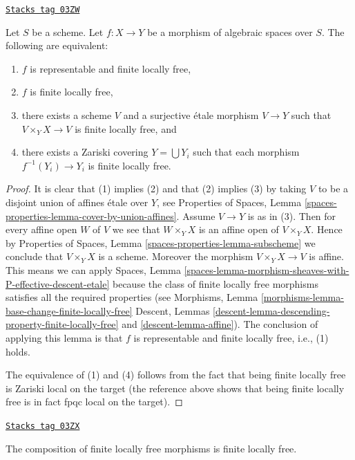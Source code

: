 \begin{lemma}
\label{spaces-morphisms-lemma-finite-locally-free-local}
\href{https://stacks.math.columbia.edu/tag/03ZW}{\texttt{Stacks tag 03ZW}}

Let $S$ be a scheme.
Let $f : X \to Y$ be a morphism of algebraic spaces over $S$.
The following are equivalent:
\begin{enumerate}
\item $f$ is representable and finite locally free,
\item $f$ is finite locally free,
\item there exists a scheme $V$ and a surjective \'etale morphism
$V \to Y$ such that $V \times_Y X \to V$ is finite locally free, and
\item there exists a Zariski covering $Y = \bigcup Y_i$ such that
each morphism $f^{-1}(Y_i) \to Y_i$ is finite locally free.
\end{enumerate}
\end{lemma}

\begin{proof}
It is clear that (1) implies (2) and that (2) implies (3) by taking
$V$ to be a disjoint union of affines \'etale over $Y$, see
Properties of Spaces,
Lemma \ref{spaces-properties-lemma-cover-by-union-affines}.
Assume $V \to Y$ is as in (3). Then for every affine open $W$ of $V$ we see
that $W \times_Y X$ is an affine open of $V \times_Y X$. Hence by
Properties of Spaces, Lemma \ref{spaces-properties-lemma-subscheme}
we conclude that $V \times_Y X$ is a scheme. Moreover the morphism
$V \times_Y X \to V$ is affine. This means we can apply
Spaces,
Lemma \ref{spaces-lemma-morphism-sheaves-with-P-effective-descent-etale}
because the class of finite locally free morphisms
satisfies all the required properties (see
Morphisms, Lemma \ref{morphisms-lemma-base-change-finite-locally-free}
Descent, Lemmas \ref{descent-lemma-descending-property-finite-locally-free}
and \ref{descent-lemma-affine}).
The conclusion of applying this lemma is that $f$ is representable
and finite locally free, i.e., (1) holds.

\medskip\noindent
The equivalence of (1) and (4) follows from the fact that being
finite locally free is Zariski local on the target (the reference above shows
that being finite locally free is in fact fpqc local on the target).
\end{proof}

\begin{lemma}
\label{spaces-morphisms-lemma-composition-finite-locally-free}
\href{https://stacks.math.columbia.edu/tag/03ZX}{\texttt{Stacks tag 03ZX}}

The composition of finite locally free morphisms is finite locally free.
\end{lemma}

